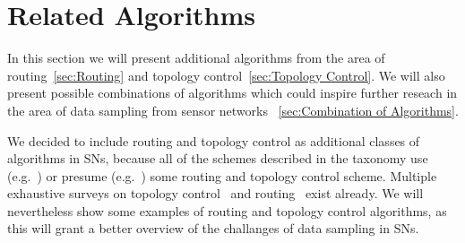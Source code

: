 
\section{Related Algorithms}
\label{sec:Related Algorithms}

In this section we will present additional algorithms from the area of
routing~\ref{sec:Routing} and topology control~\ref{sec:Topology Control}. We
will also present possible combinations of algorithms which could inspire
further reseach in the area of data sampling from sensor networks
~\ref{sec:Combination of Algorithms}.

We decided to include routing and topology control as additional classes of
algorithms in \acp{SN}, because all of the schemes described in the taxonomy
use (e.g.~\cite{padhy2006utility}) or presume
(e.g.~\cite{silberstein2006constraint}) some routing and topology control
scheme. Multiple exhaustive surveys on topology control~\cite{aziz2013survey,
li2013survey} and routing~\cite{al2004routing, pantazis2013energy,
singh2010routing} exist already. We will nevertheless show some examples of
routing and topology control algorithms, as this will grant a better overview
of the challanges of data sampling in \acp{SN}.


